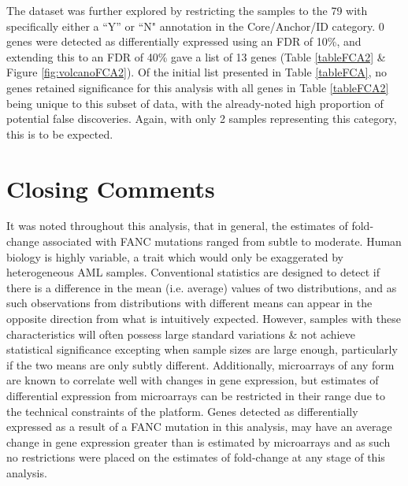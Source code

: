 \documentclass{article}\usepackage{knitr}
\begin{document}
\par
The dataset was further explored by restricting the samples to the 79 with specifically either a ``Y'' or ``N" annotation in the Core/Anchor/ID category.
0 genes were detected as differentially expressed using an FDR of 10\%, and extending this to an FDR of 40\% gave a list of 13 genes (Table \ref{tableFCA2} \& Figure \ref{fig:volcanoFCA2}).
Of the initial list presented in Table \ref{tableFCA}, no genes retained significance for this analysis with all genes in Table \ref{tableFCA2} being unique to this subset of data, with the already-noted high proportion of potential false discoveries.
Again, with only 2 samples representing this category, this is to be expected.

\clearpage
\section{Closing Comments}
It was noted throughout this analysis, that in general, the estimates of fold-change associated with FANC mutations ranged from subtle to moderate.
Human biology is highly variable, a trait which would only be exaggerated by heterogeneous AML samples.
Conventional statistics are designed to detect if there is a difference in the mean (i.e. average) values of two distributions, and as such observations from distributions with different means can appear in the opposite direction from what is intuitively expected.
However, samples with these characteristics will often possess large standard variations \& not achieve statistical significance excepting when sample sizes are large enough, particularly if the two means are only subtly different.
Additionally, microarrays of any form are known to correlate well with changes in gene expression, but estimates of differential expression from microarrays can be restricted in their range due to the technical constraints of the platform.
Genes detected as differentially expressed as a result of a FANC mutation in this analysis, may have an average change in gene expression greater than is estimated by microarrays and as such no restrictions were placed on the estimates of fold-change at any stage of this analysis.

\clearpage
\end{document}
